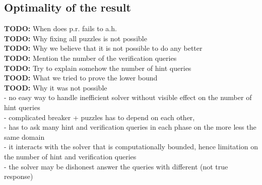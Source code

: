\subsection{Optimality of the result}
\label{st:discussion}

\begin{todo}
  \textbf{TODO:} When does p.r. fails to a.h. \\
  \textbf{TODO:} Why fixing all puzzles is not possible \\
  \textbf{TODO:} Why we believe that it is not possible to do any better \\
  \textbf{TODO:} Mention the number of the verification queries  \\
  \textbf{TODO:} Try to explain somehow the number of hint queries \\
  \textbf{TOOD:} What we tried to prove the lower bound \\
  \textbf{TOOD:} Why it was not possible \\

  - no easy way to handle inefficient solver without visible effect on the number of hint queries \\
  - complicated breaker + puzzles has to depend on each other, \\
  - has to ask many hint and verification queries in each phase on the more less the same domain \\
  - it interacts with the solver that is computationally bounded, hence limitation on the number of hint and verification queries \\
  - the solver may be dishonest answer the queries with different (not true response)
\end{todo}



